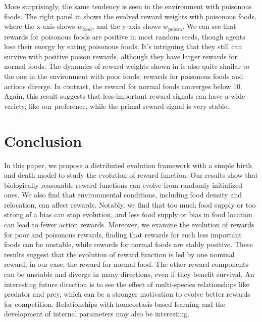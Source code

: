 More surprisingly, the same tendency is seen in the environment with poisonous foods. The right panel in  shows the evolved reward weights with poisonous foods, where the x-axis shows $w_{\mathrm{food}}$, and the y-axis shows $w_{\mathrm{poison}}$. We can see that rewards for poisonous foods are positive in most random seeds, though agents lose their energy by eating poisonous foods. It's intriguing that they still can survive with positive poison rewards, although they have larger rewards for normal foods. The dynamics of reward weights shown in  is also quite similar to the one in the environment with poor foods: rewards for poisonous foods and actions diverge. In contrast, the reward for normal foods converges below $10$. Again, this result suggests that less-important reward signals can have a wide variety, like our preference, while the primal reward signal is very stable.

\section{Conclusion}
In this paper, we propose a distributed evolution framework with a simple birth and death model to study the evolution of reward function. Our results show that biologically reasonable reward functions can evolve from randomly initialized ones. We also find that environmental conditions, including food density and relocation, can affect rewards. Notably, we find that too much food supply or too strong of a bias can stop evolution, and less food supply or bias in food location can lead to fewer action rewards. Moreover, we examine the evolution of rewards for poor and poisonous rewards, finding that rewards for such less important foods can be unstable, while rewards for normal foods are stably positive. These results suggest that the evolution of reward function is led by one nominal reward, in our case, the reward for normal food. The other reward components can be unstable and diverge in many directions, even if they benefit survival.  An interesting future direction is to see the effect of multi-species relationships like predator and prey, which can be a stronger motivation to evolve better rewards for competition. Relationships with homeostasis-based learning and the development of internal parameters may also be interesting.